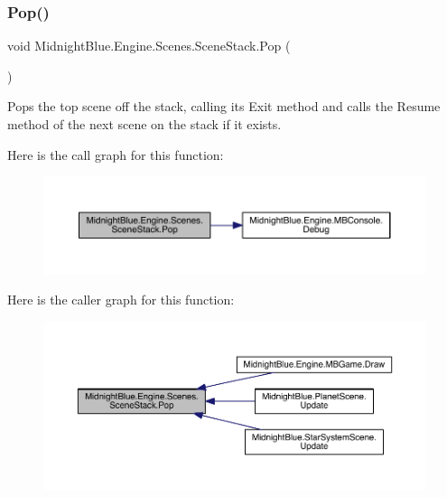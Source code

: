 \subsubsection{\texorpdfstring{Pop()}{Pop()}}
{\footnotesize\ttfamily void Midnight\+Blue.\+Engine.\+Scenes.\+Scene\+Stack.\+Pop (\begin{DoxyParamCaption}{ }\end{DoxyParamCaption})\hspace{0.3cm}{\ttfamily [inline]}}



Pops the top scene off the stack, calling its Exit method and calls the Resume method of the next scene on the stack if it exists. 

Here is the call graph for this function\+:
\nopagebreak
\begin{figure}[H]
\begin{center}
\leavevmode
\includegraphics[width=350pt]{class_midnight_blue_1_1_engine_1_1_scenes_1_1_scene_stack_a8c0ab363d287940ce8a66d1ab1356714_cgraph}
\end{center}
\end{figure}
Here is the caller graph for this function\+:
\nopagebreak
\begin{figure}[H]
\begin{center}
\leavevmode
\includegraphics[width=350pt]{class_midnight_blue_1_1_engine_1_1_scenes_1_1_scene_stack_a8c0ab363d287940ce8a66d1ab1356714_icgraph}
\end{center}
\end{figure}
\hypertarget{class_midnight_blue_1_1_engine_1_1_scenes_1_1_scene_stack_ac98c028592de2bbaad1babf63bfa1aa3}{}\label{class_midnight_blue_1_1_engine_1_1_scenes_1_1_scene_stack_ac98c028592de2bbaad1babf63bfa1aa3} 
